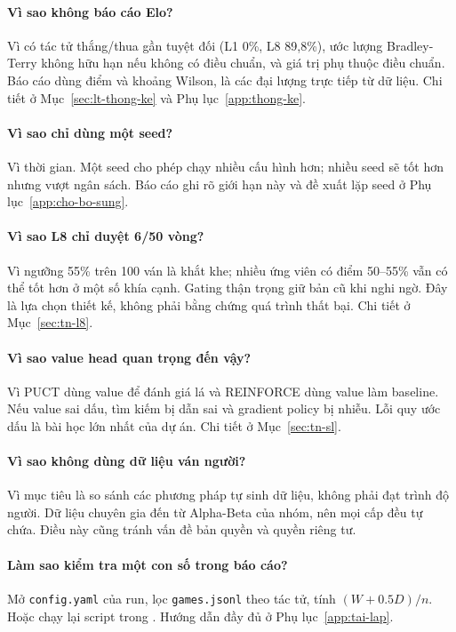 \paragraph{Vì sao không báo cáo Elo?}
Vì có tác tử thắng/thua gần tuyệt đối (L1 0\%, L8 89,8\%), ước lượng Bradley-Terry không hữu
hạn nếu không có điều chuẩn, và giá trị phụ thuộc điều chuẩn. Báo cáo dùng điểm và khoảng
Wilson, là các đại lượng trực tiếp từ dữ liệu. Chi tiết ở Mục~\ref{sec:lt-thong-ke} và
Phụ lục~\ref{app:thong-ke}.

\paragraph{Vì sao chỉ dùng một seed?}
Vì thời gian. Một seed cho phép chạy nhiều cấu hình hơn; nhiều seed sẽ tốt hơn nhưng vượt ngân
sách. Báo cáo ghi rõ giới hạn này và đề xuất lặp seed ở Phụ lục~\ref{app:cho-bo-sung}.

\paragraph{Vì sao L8 chỉ duyệt 6/50 vòng?}
Vì ngưỡng 55\% trên 100 ván là khắt khe; nhiều ứng viên có điểm 50--55\% vẫn có thể tốt hơn ở
một số khía cạnh. Gating thận trọng giữ bản cũ khi nghi ngờ. Đây là lựa chọn thiết kế, không
phải bằng chứng quá trình thất bại. Chi tiết ở Mục~\ref{sec:tn-l8}.

\paragraph{Vì sao value head quan trọng đến vậy?}
Vì PUCT dùng value để đánh giá lá và REINFORCE dùng value làm baseline. Nếu value sai dấu, tìm
kiếm bị dẫn sai và gradient policy bị nhiễu. Lỗi quy ước dấu là bài học lớn nhất của dự án.
Chi tiết ở Mục~\ref{sec:tn-sl}.

\paragraph{Vì sao không dùng dữ liệu ván người?}
Vì mục tiêu là so sánh các phương pháp tự sinh dữ liệu, không phải đạt trình độ người. Dữ liệu
chuyên gia đến từ Alpha-Beta của nhóm, nên mọi cấp đều tự chứa. Điều này cũng tránh vấn đề bản
quyền và quyền riêng tư.

\paragraph{Làm sao kiểm tra một con số trong báo cáo?}
Mở \texttt{config.yaml} của run, lọc \texttt{games.jsonl} theo tác tử, tính $(W+0.5D)/n$. Hoặc
chạy lại script trong . Hướng dẫn đầy đủ ở Phụ lục~\ref{app:tai-lap}.

